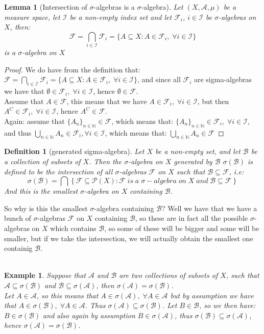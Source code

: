 \documentclass{article}
\newcommand{\N}{\mathbb{N}}
\newcommand{\A}{\mathcal{A}}
\newcommand{\F}{\mathcal{F}}
\newcommand{\B}{\mathcal{B}}
\newtheorem{definition}{Definition}
\newtheorem{ex}{Example}
\newtheorem{lemma}{Lemma}
\newtheorem{proof}{Proof}
\begin{document}
\begin{lemma}[Intersection of $\sigma$-algebras is a $\sigma$-algebra]
Let $(X,\A, \mu)$ be a measure space, let $\mathcal{I}$ be a non-empty index set and let $\F_{i}$, $i\in \mathcal{I}$ be $\sigma$-algebras on $X$, then: 
\[\F = \bigcap_{i \in \mathcal{I}}\F_{i} = \{A\subseteq X: A\in \F_{i},\; \forall i\in \mathcal{I}\}
\] 
is a $\sigma$-algebra on $X$
\end{lemma} 

\begin{proof}
We do have from the definition that: $\F = \bigcap_{i \in \mathcal{I}}\F_{i} = \{A\subseteq X: A\in \F_{i},\; \forall i\in \mathcal{I}\}$, and since all $\F_{i}$ are sigma-algebras we have that $\emptyset \in \F_{i}, \; \forall i\in \mathcal{I}$, hence $\emptyset \in \F$.\\ 
Assume that $A\in \F$, this means that we have $A\in \F_{i}, \; \forall i\in \mathcal{I}$, but then $A^{C}\in \F_{i}, \; \forall i\in \mathcal{I}$, hence $A^{C} \in \F$.\\ 
Again: assume that $\{A_{n}\}_{n\in \N} \in \F$, which means that: $\{A_{n}\}_{n\in \N} \in \F_{i},\; \forall i\in \mathcal{I}$, and thus $\bigcup_{n\in \N}A_{n} \in \F_{i}, \forall i\in \mathcal{I}$, which means that: $\bigcup_{n\in \N}A_{n} \in \F$
\end{proof}

\begin{definition}[generated sigma-algebra]
Let $X$ be a non-empty set, and let $\B$ be a collection of subsets of $X$. Then the $\sigma$-algebra on $X$ generated by $\B$ $\sigma(\B)$ is defined to be the intersection of all $\sigma$-algebras $\F$ on $X$ such that $\B\subseteq \F$, i.e: 
\[\sigma(\B) = \bigcap \left\{\F \subseteq \mathcal{P}(X): \F\; is \; a\; \sigma-algebra\; on \; X\; and\; \B\subseteq \F\right\}
\]
And this is the smallest $\sigma$-algebra on $X$ containing $\B$.
\end{definition}

So why is this the smallest $\sigma$-algebra containing $\B$? Well we have that we have a bunch of $\sigma$-algebras $\F$ on $X$ containing $\B$, so these are in fact all the possible $\sigma$-algebras on $X$ which contains $\B$, so some of these will be bigger and some will be smaller, but if we take the intersection, we will actually obtain the smallest one containig $\B$. 
\\~\\ 
\begin{ex}
Suppose that $\A$ and $\B$ are two collections of subsets of $X$, such that $\A\subseteq \sigma(\B)$ and $\B \subseteq \sigma(\A)$, then $\sigma(\A)=\sigma(\B)$.\\ 
Let $A\in \A$, so this means that $A\in \sigma(\A),\; \forall A\in \A$ but by assumption we have that $A\in \sigma(\B), \; \forall A\in \A$. Thus $\sigma(\A) \subseteq \sigma(\B)$. Let $B\in \B$, so we then have: $B\in \sigma(\B)$ and also again by assumption $B\in \sigma(\A)$, thus $\sigma(\B)\subseteq \sigma(\A)$, hence $\sigma(\A) = \sigma(\B)$. 
\end{ex}
\end{document}
